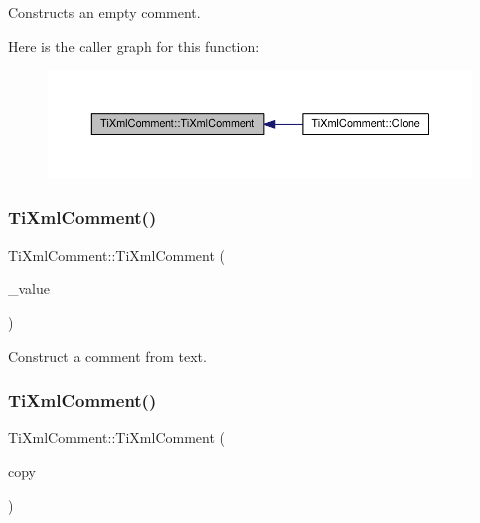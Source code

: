 Constructs an empty comment. 

Here is the caller graph for this function\+:
\nopagebreak
\begin{figure}[H]
\begin{center}
\leavevmode
\includegraphics[width=350pt]{class_ti_xml_comment_aaa3252031d3e8bd3a2bf51a1c61201b7_icgraph}
\end{center}
\end{figure}
\mbox{\label{class_ti_xml_comment_a37e7802ef17bc03ebe5ae79bf0713d47}} 
\subsubsection{\texorpdfstring{Ti\+Xml\+Comment()}{TiXmlComment()}\hspace{0.1cm}{\footnotesize\ttfamily [2/3]}}
{\footnotesize\ttfamily Ti\+Xml\+Comment\+::\+Ti\+Xml\+Comment (\begin{DoxyParamCaption}\item[{const char $\ast$}]{\+\_\+value }\end{DoxyParamCaption})\hspace{0.3cm}{\ttfamily [inline]}}



Construct a comment from text. 

\mbox{\label{class_ti_xml_comment_afaec41ac2760ce946ba1590eb5708e50}} 
\subsubsection{\texorpdfstring{Ti\+Xml\+Comment()}{TiXmlComment()}\hspace{0.1cm}{\footnotesize\ttfamily [3/3]}}
{\footnotesize\ttfamily Ti\+Xml\+Comment\+::\+Ti\+Xml\+Comment (\begin{DoxyParamCaption}\item[{const \hyperlink{class_ti_xml_comment}{Ti\+Xml\+Comment} \&}]{copy }\end{DoxyParamCaption})}

